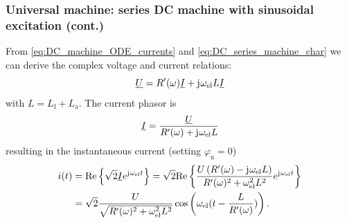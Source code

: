 \begin{frame}
	\frametitle{Universal machine: series DC machine with sinusoidal excitation (cont.)}
		From \eqref{eq:DC_machine_ODE_currents} and \eqref{eq:DC_series_machine_char} we can derive the complex voltage and current relations:
		\begin{equation}
			\underline{U} = R'(\omega)\underline{I} + \mathrm{j}\mkern1mu \omega_\mathrm{el} L \underline{I}
		\end{equation}
		with $L = L_\mathrm{f}+L_\mathrm{a}$. The current phasor is
		\begin{equation}
			\underline{I} = \frac{\underline{U}}{R'(\omega) + \mathrm{j}\mkern1mu \omega_\mathrm{el} L}
		\end{equation}
		resulting in the instantaneous current (setting $\varphi_{\mathrm{u}}=0$)
		\begin{align}
			i(t) &= \mathrm{Re}\left\{ \sqrt{2}\underline{I} e^{\mathrm{j}\mkern1mu\omega_\mathrm{el}t}\right\}=\sqrt{2}\mathrm{Re}\left\{ \frac{U\left(R'(\omega)-\mathrm{j}\mkern1mu\omega_\mathrm{el}L\right)}{R'(\omega)^2+\omega_\mathrm{el}^2L^2} e^{\mathrm{j}\mkern1mu\omega_\mathrm{el}t}\right\}\\
			& =\sqrt{2}\frac{U}{\sqrt{R'(\omega)^2+\omega_\mathrm{el}^2L^2}}\cos\left(\omega_\mathrm{el}(t-\frac{L}{R'(\omega)})\right).
		\end{align} 
\end{frame}

